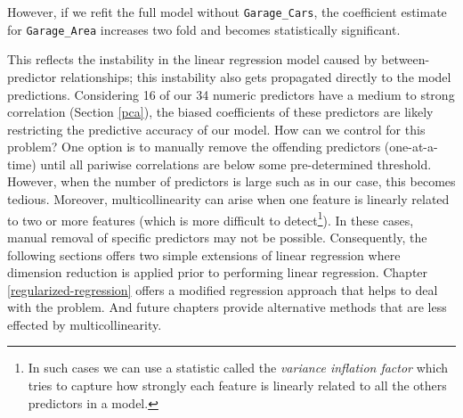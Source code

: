 \documentclass[]{krantz}
\makeatletter
\newenvironment{Shaded}{\begin{snugshade}}{\end{snugshade}}
\newcommand{\CommentTok}[1]{\textcolor[rgb]{0.37,0.37,0.37}{\textit{#1}}}
\newcommand{\DataTypeTok}[1]{\textcolor[rgb]{0.27,0.27,0.27}{#1}}
\newcommand{\DecValTok}[1]{\textcolor[rgb]{0.06,0.06,0.06}{#1}}
\newcommand{\KeywordTok}[1]{\textcolor[rgb]{0.27,0.27,0.27}{\textbf{#1}}}
\newcommand{\NormalTok}[1]{#1}
\newcommand{\OperatorTok}[1]{\textcolor[rgb]{0.43,0.43,0.43}{\textbf{#1}}}
\newcommand{\StringTok}[1]{\textcolor[rgb]{0.5,0.5,0.5}{#1}}
\newenvironment{kframe}{%
\medskip{}
\setlength{\fboxsep}{.8em}
 \def\at@end@of@kframe{}%
 \ifinner\ifhmode%
  \def\at@end@of@kframe{\end{minipage}}%
  \begin{minipage}{\columnwidth}%
 \fi\fi%
 \def\FrameCommand##1{\hskip\@totalleftmargin \hskip-\fboxsep
 \colorbox{shadecolor}{##1}\hskip-\fboxsep
     \hskip-\linewidth \hskip-\@totalleftmargin \hskip\columnwidth}%
 \MakeFramed {\advance\hsize-\width
   \@totalleftmargin\z@ \linewidth\hsize
   \@setminipage}}%
 {\par\unskip\endMakeFramed%
 \at@end@of@kframe}
\renewenvironment{Shaded}{\begin{kframe}}{\end{kframe}}
\makeatother
\begin{document}
However, if we refit the full model without \texttt{Garage\_Cars}, the coefficient estimate for \texttt{Garage\_Area} increases two fold and becomes statistically significant.

\begin{Shaded}
\end{Shaded}

This reflects the instability in the linear regression model caused by between-predictor relationships; this instability also gets propagated directly to the model predictions. Considering 16 of our 34 numeric predictors have a medium to strong correlation (Section \ref{pca}), the biased coefficients of these predictors are likely restricting the predictive accuracy of our model. How can we control for this problem? One option is to manually remove the offending predictors (one-at-a-time) until all pariwise correlations are below some pre-determined threshold. However, when the number of predictors is large such as in our case, this becomes tedious. Moreover, multicollinearity can arise when one feature is linearly related to two or more features (which is more difficult to detect\footnote{In such cases we can use a statistic called the \emph{variance inflation factor} which tries to capture how strongly each feature is linearly related to all the others predictors in a model.}). In these cases, manual removal of specific predictors may not be possible. Consequently, the following sections offers two simple extensions of linear regression where dimension reduction is applied prior to performing linear regression. Chapter \ref{regularized-regression} offers a modified regression approach that helps to deal with the problem. And future chapters provide alternative methods that are less effected by multicollinearity.
\end{document}
